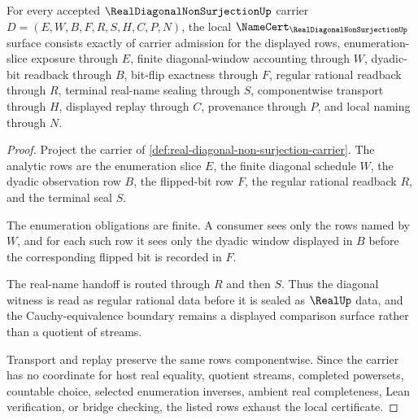 \begin{theorem}
\label{thm:real-diagonal-non-surjection-namecert-obligations}
For every accepted $\RealDiagonalNonSurjectionUp$ carrier $D=(E,W,B,F,R,S,H,C,P,N)$, the local $\NameCert_{\RealDiagonalNonSurjectionUp}$ surface consists exactly of carrier admission for the displayed rows, enumeration-slice exposure through $E$, finite diagonal-window accounting through $W$, dyadic-bit readback through $B$, bit-flip exactness through $F$, regular rational readback through $R$, terminal real-name sealing through $S$, componentwise transport through $H$, displayed replay through $C$, provenance through $P$, and local naming through $N$.
\end{theorem}
\begin{proof}
Project the carrier of \autoref{def:real-diagonal-non-surjection-carrier}. The analytic rows are the enumeration slice $E$, the finite diagonal schedule $W$, the dyadic observation row $B$, the flipped-bit row $F$, the regular rational readback $R$, and the terminal seal $S$.

The enumeration obligations are finite. A consumer sees only the rows named by $W$, and for each such row it sees only the dyadic window displayed in $B$ before the corresponding flipped bit is recorded in $F$.

The real-name handoff is routed through $R$ and then $S$. Thus the diagonal witness is read as regular rational data before it is sealed as $\RealUp$ data, and the Cauchy-equivalence boundary remains a displayed comparison surface rather than a quotient of streams.

Transport and replay preserve the same rows componentwise. Since the carrier has no coordinate for host real equality, quotient streams, completed powersets, countable choice, selected enumeration inverses, ambient real completeness, Lean verification, or bridge checking, the listed rows exhaust the local certificate.
\end{proof}


